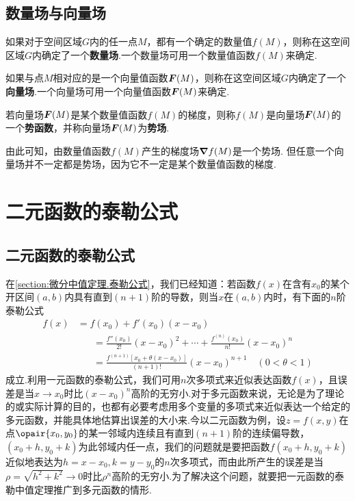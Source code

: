 \subsection{数量场与向量场}
\begin{definition}
如果对于空间区域\(G\)内的任一点\(M\)，都有一个确定的数量值\(f(M)\)，则称在这空间区域\(G\)内确定了一个\textbf{数量场}.一个数量场可用一个数量值函数\(f(M)\)来确定.

如果与点\(M\)相对应的是一个向量值函数\(\boldsymbol{F}(M)\)，则称在这空间区域\(G\)内确定了一个\textbf{向量场}.一个向量场可用一个向量值函数\(\boldsymbol{F}(M)\)来确定.

若向量场\(\boldsymbol{F}(M)\)是某个数量值函数\(f(M)\)的梯度，则称\(f(M)\)是向量场\(\boldsymbol{F}(M)\)的一个\textbf{势函数}，并称向量场\(\boldsymbol{F}(M)\)为\textbf{势场}.
\end{definition}
由此可知，由数量值函数\(f(M)\)产生的梯度场\(\grad{f}(M)\)是一个势场.
但任意一个向量场并不一定都是势场，因为它不一定是某个数量值函数的梯度.

\section{二元函数的泰勒公式}
\subsection{二元函数的泰勒公式}
在\cref{section:微分中值定理.泰勒公式}，我们已经知道：若函数\(f(x)\)在含有\(x_0\)的某个开区间\((a,b)\)内具有直到\((n+1)\)阶的导数，则当\(x\)在\((a,b)\)内时，有下面的\(n\)阶泰勒公式\begin{align*}
f(x) &= f(x_0) + f'(x_0) (x-x_0) \\
&\hspace{20pt}=\frac{f''(x_0)}{2!} (x-x_0)^2 + \dotsb + \frac{f^{(n)}(x_0)}{n!} (x-x_0)^n \\
&\hspace{20pt}=\frac{f^{(n+1)}[x_0+\theta(x-x_0)]}{(n+1)!} (x-x_0)^{n+1}
\quad(0<\theta<1)
\end{align*}成立.利用一元函数的泰勒公式，我们可用\(n\)次多项式来近似表达函数\(f(x)\)，且误差是当\(x \to x_0\)时比\((x-x_0)^n\)高阶的无穷小.对于多元函数来说，无论是为了理论的或实际计算的目的，也都有必要考虑用多个变量的多项式来近似表达一个给定的多元函数，并能具体地估算出误差的大小来.今以二元函数为例，设\(z=f(x,y)\)在点\(\opair{x_0,y_0}\)的某一邻域内连续且有直到\((n+1)\)阶的连续偏导数，\((x_0+h,y_0+k)\)为此邻域内任一点，我们的问题就是要把函数\(f(x_0+h,y_0+k)\)近似地表达为\(h=x-x_0,k=y-y_0\)的\(n\)次多项式，而由此所产生的误差是当\(\rho=\sqrt{h^2+k^2}\to0\)时比\(\rho^n\)高阶的无穷小.为了解决这个问题，就要把一元函数的泰勒中值定理推广到多元函数的情形.


